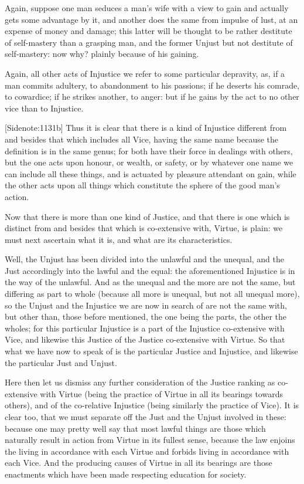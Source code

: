 Again, suppose one man seduces a man's wife with a view to gain and
actually gets some advantage by it, and another does the same from
impulse of lust, at an expense of money and damage; this latter will be
thought to be rather destitute of self-mastery than a grasping man, and
the former Unjust but not destitute of self-mastery: now why? plainly
because of his gaining.

Again, all other acts of Injustice we refer to some particular
depravity, as, if a man commits adultery, to abandonment to his
passions; if he deserts his comrade, to cowardice; if he strikes
another, to anger: but if he gains by the act to no other vice than to
Injustice.

[Sidenote:1131b] Thus it is clear that there is a kind of Injustice
different from and besides that which includes all Vice, having the same
name because the definition is in the same genus; for both have their
force in dealings with others, but the one acts upon honour, or wealth,
or safety, or by whatever one name we can include all these things, and
is actuated by pleasure attendant on gain, while the other acts upon all
things which constitute the sphere of the good man's action.

Now that there is more than one kind of Justice, and that there is one
which is distinct from and besides that which is co-extensive with,
Virtue, is plain: we must next ascertain what it is, and what are its
characteristics.

Well, the Unjust has been divided into the unlawful and the unequal, and
the Just accordingly into the lawful and the equal: the aforementioned
Injustice is in the way of the unlawful. And as the unequal and the more
are not the same, but differing as part to whole (because all more is
unequal, but not all unequal more), so the Unjust and the Injustice we
are now in search of are not the same with, but other than, those before
mentioned, the one being the parts, the other the wholes; for this
particular Injustice is a part of the Injustice co-extensive with Vice,
and likewise this Justice of the Justice co-extensive with Virtue.
So that what we have now to speak of is the particular Justice and
Injustice, and likewise the particular Just and Unjust.

Here then let us dismiss any further consideration of the Justice
ranking as co-extensive with Virtue (being the practice of Virtue in all
its bearings towards others), and of the co-relative Injustice (being
similarly the practice of Vice). It is clear too, that we must separate
off the Just and the Unjust involved in these: because one may pretty
well say that most lawful things are those which naturally result in
action from Virtue in its fullest sense, because the law enjoins the
living in accordance with each Virtue and forbids living in accordance
with each Vice. And the producing causes of Virtue in all its bearings
are those enactments which have been made respecting education for
society.

